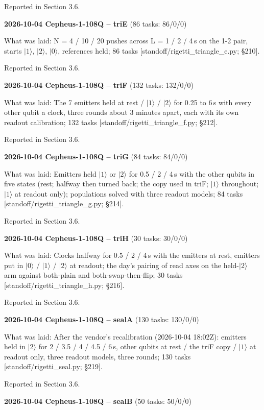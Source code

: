 \documentclass[11pt]{article}
\begin{document}
Reported in Section 3.6.

\textbf{2026-10-04 Cepheus-1-108Q -- triE} (86 tasks: 86/0/0)

What was laid: N = 4 / 10 / 20 pushes across L = 1 / 2 / 4\,\textmu s on the 1-2 pair, starts \(|1\rangle\), \(|2\rangle\), \(|0\rangle\), references held; 86 tasks {[}standoff/rigetti\_triangle\_e.py; \S{}210{]}.

Reported in Section 3.6.

\textbf{2026-10-04 Cepheus-1-108Q -- triF} (132 tasks: 132/0/0)

What was laid: The 7 emitters held at rest / \(|1\rangle\) / \(|2\rangle\) for 0.25 to 6\,\textmu s with every other qubit a clock, three rounds about 3 minutes apart, each with its own readout calibration; 132 tasks {[}standoff/rigetti\_triangle\_f.py; \S{}212{]}.

Reported in Section 3.6.

\textbf{2026-10-04 Cepheus-1-108Q -- triG} (84 tasks: 84/0/0)

What was laid: Emitters held \(|1\rangle\) or \(|2\rangle\) for 0.5 / 2 / 4\,\textmu s with the other qubits in five states (rest; halfway then turned back; the copy used in triF; \(|1\rangle\) throughout; \(|1\rangle\) at readout only); populations solved with three readout models; 84 tasks {[}standoff/rigetti\_triangle\_g.py; \S{}214{]}.

Reported in Section 3.6.

\textbf{2026-10-04 Cepheus-1-108Q -- triH} (30 tasks: 30/0/0)

What was laid: Clocks halfway for 0.5 / 2 / 4\,\textmu s with the emitters at rest, emitters put in \(|0\rangle\) / \(|1\rangle\) / \(|2\rangle\) at readout; the day's pairing of read axes on the held-\(|2\rangle\) arm against both-plain and both-swap-then-flip; 30 tasks {[}standoff/rigetti\_triangle\_h.py; \S{}216{]}.

Reported in Section 3.6.

\textbf{2026-10-04 Cepheus-1-108Q -- sealA} (130 tasks: 130/0/0)

What was laid: After the vendor's recalibration (2026-10-04 18:02Z): emitters held in \(|2\rangle\) for 2 / 3.5 / 4 / 4.5 / 6\,\textmu s, other qubits at rest / the triF copy / \(|1\rangle\) at readout only, three readout models, three rounds; 130 tasks {[}standoff/rigetti\_seal.py; \S{}219{]}.

Reported in Section 3.6.

\textbf{2026-10-04 Cepheus-1-108Q -- sealB} (50 tasks: 50/0/0)
\end{document}
